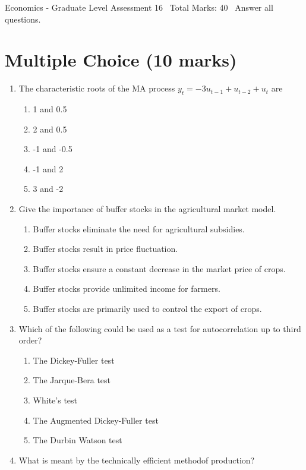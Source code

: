 \documentclass[12pt]{article}
\begin{document}
\begin{center}
Economics - Graduate Level Assessment 16 \
Total Marks: 40 \
Answer all questions.
\end{center}

\section*{Multiple Choice (10 marks)}
\begin{enumerate}[label=\arabic*.]
\item The characteristic roots of the MA process $y_t = -3 u_{t-1} + u_{t-2} + u_t$ are
\begin{enumerate}[label=(\alph*)]
    \item 1 and 0.5
    \item 2 and 0.5
    \item -1 and -0.5
    \item -1 and 2
    \item 3 and -2
\end{enumerate}
\item Give the importance of buffer stocks in the agricultural market model.
\begin{enumerate}[label=(\alph*)]
    \item Buffer stocks eliminate the need for agricultural subsidies.
    \item Buffer stocks result in price fluctuation.
    \item Buffer stocks ensure a constant decrease in the market price of crops.
    \item Buffer stocks provide unlimited income for farmers.
    \item Buffer stocks are primarily used to control the export of crops.
\end{enumerate}
\item Which of the following could be used as a test for autocorrelation up to third order?
\begin{enumerate}[label=(\alph*)]
    \item The Dickey-Fuller test
    \item The Jarque-Bera test
    \item White's test
    \item The Augmented Dickey-Fuller test
    \item The Durbin Watson test
\end{enumerate}
\item What is meant by the technically efficient methodof production?
\begin{enumerate}[label=(\alph*)]

\end{enumerate}
\end{enumerate}
\end{document}
